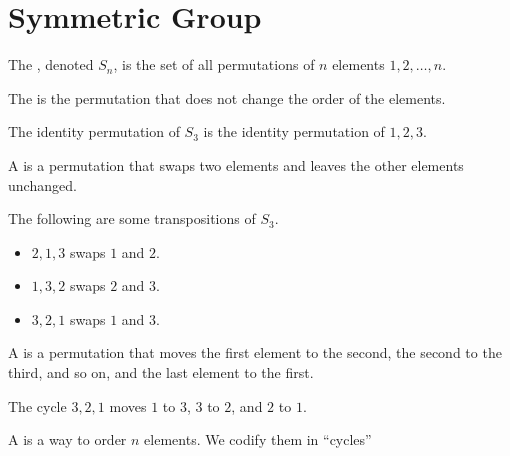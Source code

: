 \section{Symmetric Group}

\begin{definition}\label{def:symmetric_group}
    The , denoted $S_n$, is the set of all permutations of $n$ elements $1, 2, \dots, n$.
\end{definition}

\begin{definition}\label{def:identity_permutation}
    The  is the permutation that does not change the order of the elements.
\end{definition}

\begin{example}
    The identity permutation of $S_3$ is the identity permutation of $1, 2, 3$.
\end{example}

\begin{definition}[Transposition]\label{def:transposition}
    A  is a permutation that swaps two elements and leaves the other elements unchanged.
\end{definition}

\begin{example}
    The following are some transpositions of $S_3$.
    \begin{itemize}
        \item $2, 1, 3$ swaps $1$ and $2$.
        \item $1, 3, 2$ swaps $2$ and $3$.
        \item $3, 2, 1$ swaps $1$ and $3$.
    \end{itemize}
\end{example}

\begin{definition}[Cycle]\label{def:cycle}
    A  is a permutation that moves the first element to the second, the second to the third, and so on, and the last element to the first.
\end{definition}

\begin{example}
    The cycle $3, 2, 1$ moves $1$ to $3$, $3$ to $2$, and $2$ to $1$.
\end{example}

\begin{definition}[Permutation]\label{def:permutation}
    A  is a way to order $n$ elements. We codify them in ``cycles''
\end{definition}

